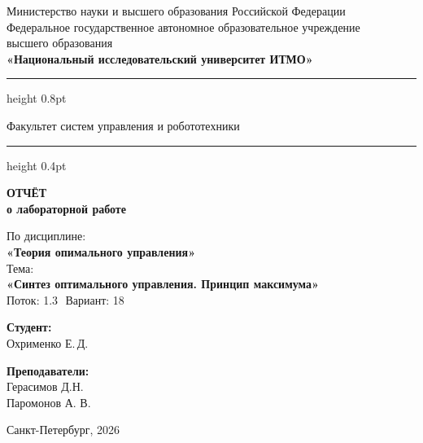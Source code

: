 \documentclass[a4paper,12pt]{article}
\begin{document}
	
	\begin{titlepage}
		\centering
		
		\vspace*{0.5cm}
		{\small
			Министерство науки и высшего образования Российской Федерации\\[2pt]
			Федеральное государственное автономное образовательное учреждение\\
			высшего образования\\[2pt]
			\textbf{«Национальный исследовательский университет ИТМО»}\\
		}
		
		\vspace{0.8cm}
		\hrule height 0.8pt
		\vspace{0.3cm}
		
		{\large Факультет систем управления и робототехники}
		
		\vspace{0.3cm}
		\hrule height 0.4pt
		\vspace{2.5cm}
		
		{\Huge\bfseries ОТЧЁТ}\\[0.4cm]
		{\LARGE\bfseries о лабораторной работе}\\[0.8cm]
		
		\begin{tcolorbox}[
			colback=gray!4,
			colframe=gray!10,
			boxrule=0.8pt,
			arc=4pt,
			left=12pt, right=12pt, top=8pt, bottom=8pt
			]
			\centering
			{\large По дисциплине:\\[4pt]}
			{\large\bfseries «Теория опимального управления»}\\[10pt]
			{\large Тема:\\[4pt]}
			{\large\bfseries «Синтез оптимального управления. Принцип максимума»} \\[10pt]
			{\large Поток: 1.3 \( \) Вариант: 18}
		\end{tcolorbox}
		
		\vspace{3cm}
		
		\begin{minipage}{0.45\textwidth}
			\raggedright
			{\large\bfseries Студент:}\\[4pt]
			Охрименко Е.\,Д.\\
		\end{minipage}
		\hfill
		\begin{minipage}{0.45\textwidth}
			\raggedleft
			{\large\bfseries Преподаватели:}\\[4pt]
			Герасимов Д.Н.\\
			Паромонов А. В.
		\end{minipage}
		
		\vfill
		\vspace{0.4cm}
		{\large Санкт-Петербург, 2026}
	\end{titlepage}
	
\end{document}
